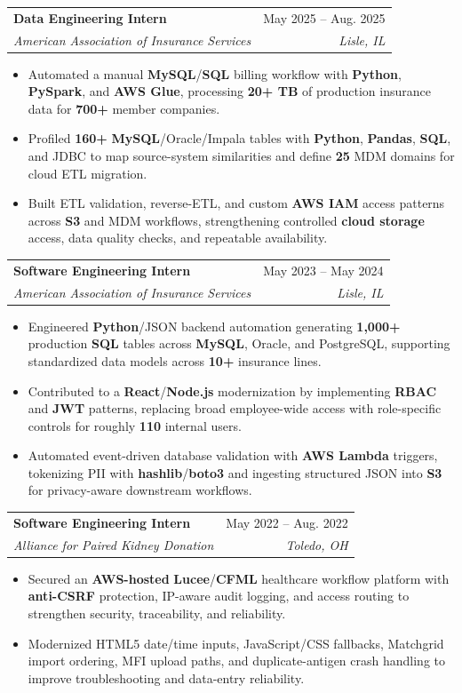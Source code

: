 \documentclass[letterpaper,11pt]{article}
\makeatletter
\newcommand{\resumeItem}[1]{
  \item\small{
    {#1 \vspace{-1pt}}
  }
}
\newcommand{\resumeSubheading}[4]{
  \vspace{-1pt}\item
    \begin{tabular*}{0.97\textwidth}[t]{l@{\extracolsep{\fill}}r}
      \textbf{#1} & #2 \\
      \textit{\small#3} & \textit{\small #4} \\
    \end{tabular*}\vspace{-3pt}
}
\newcommand{\resumeItemListStart}{\begin{itemize}[leftmargin=0.16in, itemsep=0pt, topsep=1pt, parsep=0pt]}
\newcommand{\resumeItemListEnd}{\end{itemize}\vspace{-4pt}}
\makeatother
\begin{document}
    \resumeSubheading
      {Data Engineering Intern}{May 2025 -- Aug. 2025}
      {American Association of Insurance Services}{Lisle, IL}
      \resumeItemListStart
        \resumeItem{Automated a manual \textbf{MySQL}/\textbf{SQL} billing workflow with \textbf{Python}, \textbf{PySpark}, and \textbf{AWS Glue}, processing \textbf{20+ TB} of production insurance data for \textbf{700+} member companies.}
        \resumeItem{Profiled \textbf{160+} \textbf{MySQL}/Oracle/Impala tables with \textbf{Python}, \textbf{Pandas}, \textbf{SQL}, and JDBC to map source-system similarities and define \textbf{25} MDM domains for cloud ETL migration.}
        \resumeItem{Built ETL validation, reverse-ETL, and custom \textbf{AWS IAM} access patterns across \textbf{S3} and MDM workflows, strengthening controlled \textbf{cloud storage} access, data quality checks, and repeatable availability.}
      \resumeItemListEnd

    \resumeSubheading
      {Software Engineering Intern}{May 2023 -- May 2024}
      {American Association of Insurance Services}{Lisle, IL}
      \resumeItemListStart
        \resumeItem{Engineered \textbf{Python}/JSON backend automation generating \textbf{1,000+} production \textbf{SQL} tables across \textbf{MySQL}, Oracle, and PostgreSQL, supporting standardized data models across \textbf{10+} insurance lines.}
        \resumeItem{Contributed to a \textbf{React}/\textbf{Node.js} modernization by implementing \textbf{RBAC} and \textbf{JWT} patterns, replacing broad employee-wide access with role-specific controls for roughly \textbf{110} internal users.}
        \resumeItem{Automated event-driven database validation with \textbf{AWS Lambda} triggers, tokenizing PII with \textbf{hashlib}/\textbf{boto3} and ingesting structured JSON into \textbf{S3} for privacy-aware downstream workflows.}
      \resumeItemListEnd

    \resumeSubheading
      {Software Engineering Intern}{May 2022 -- Aug. 2022}
      {Alliance for Paired Kidney Donation}{Toledo, OH}
      \resumeItemListStart
        \resumeItem{Secured an \textbf{AWS-hosted} \textbf{Lucee}/\textbf{CFML} healthcare workflow platform with \textbf{anti-CSRF} protection, IP-aware audit logging, and access routing to strengthen security, traceability, and reliability.}
        \resumeItem{Modernized HTML5 date/time inputs, JavaScript/CSS fallbacks, Matchgrid import ordering, MFI upload paths, and duplicate-antigen crash handling to improve troubleshooting and data-entry reliability.}
      \resumeItemListEnd
\end{document}
